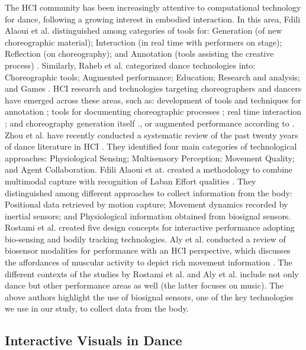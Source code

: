 The HCI community has been increasingly attentive to computational technology for dance, following a growing interest in embodied interaction. In this area, Fdili Alaoui et al. distinguished among categories of tools for: Generation (of new choreographic material); Interaction (in real time with performers on stage); Reflection (on choreography); and Annotation (tools assisting the creative process) \cite{fdili_alaoui_chiseling_2013}. Similarly, Raheb et al. categorized dance technologies into: Choreographic tools; Augmented performance; Education; Research and analysis; and Games  \cite{raheb_dance_2019}.  HCI research and technologies targeting choreographers and dancers have emerged across these areas, such as: development of tools and techniques for annotation \cite{cabral_multimodal_2011}; tools for documenting choreographic processes \cite{ciolfi_felice_knotation:_2018, ciolfi_felice_studying_2021}; real time interaction \cite{fdili_alaoui_chiseling_2013}; and choreography generation itself \cite{calvert_evolution_1993}., or augmented performance according to \cite{raheb_dance_2019}. Zhou et al. have recently conducted a systematic review of the past twenty years of dance literature in HCI \cite{zhou_dance_2021}. They identified four main categories of technological approaches: Physiological Sensing; Multisensory Perception; Movement Quality; and Agent Collaboration. Fdili Alaoui et at. created a methodology to combine multimodal capture with recognition of Laban Effort qualities \cite{fdili_alaoui_seeing_2017}. They distinguished among different approaches to collect information from the body: Positional data retrieved by motion capture; Movement dynamics recorded by inertial sensors; and Physiological information obtained from biosignal sensors. Rostami et al. \cite{rostami_bio-sensed_2017} created five design concepts for interactive performance adopting bio-sensing and bodily tracking technologies. Aly et al. conducted a review of biosensor modalities for performance with an HCI perspective, which discusses the affordances of muscular activity to depict rich movement information \cite{aly_appropriating_2021}. The different contexts of the studies by Rostami et al. and Aly et al. include not only dance but other performance areas as well (the latter focuses on music). The above authors highlight the use of biosignal sensors, one of the key technologies we use in our study, to collect data from the body.

\subsection{Interactive Visuals in Dance}

